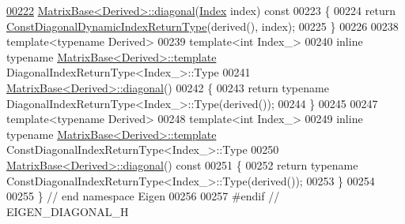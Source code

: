\begin{DoxyCode}
\hyperlink{group___core___module_aed11a711c0a3d5dbf8bc094008e29846}{00222} \hyperlink{group___core___module_ab5768147536273eb2dbdfa389cfd26a3}{MatrixBase<Derived>::diagonal}(\hyperlink{namespace_eigen_a62e77e0933482dafde8fe197d9a2cfde}{Index} index)\textcolor{keyword}{ const}
00223 \textcolor{keyword}{}\{
00224   \textcolor{keywordflow}{return} \hyperlink{group___core___module_class_eigen_1_1_transpose}{ConstDiagonalDynamicIndexReturnType}(derived(), index);
00225 \}
00226 
00238 \textcolor{keyword}{template}<\textcolor{keyword}{typename} Derived>
00239 \textcolor{keyword}{template}<\textcolor{keywordtype}{int} Index\_>
00240 \textcolor{keyword}{inline} \textcolor{keyword}{typename} \hyperlink{group___core___module_class_eigen_1_1_matrix_base}{MatrixBase<Derived>::template} 
      DiagonalIndexReturnType<Index\_>::Type
00241 \hyperlink{group___core___module_ab5768147536273eb2dbdfa389cfd26a3}{MatrixBase<Derived>::diagonal}()
00242 \{
00243   \textcolor{keywordflow}{return} \textcolor{keyword}{typename} DiagonalIndexReturnType<Index\_>::Type(derived());
00244 \}
00245 
00247 \textcolor{keyword}{template}<\textcolor{keyword}{typename} Derived>
00248 \textcolor{keyword}{template}<\textcolor{keywordtype}{int} Index\_>
00249 \textcolor{keyword}{inline} \textcolor{keyword}{typename} \hyperlink{group___core___module_class_eigen_1_1_matrix_base}{MatrixBase<Derived>::template} 
      ConstDiagonalIndexReturnType<Index\_>::Type
00250 \hyperlink{group___core___module_ab5768147536273eb2dbdfa389cfd26a3}{MatrixBase<Derived>::diagonal}()\textcolor{keyword}{ const}
00251 \textcolor{keyword}{}\{
00252   \textcolor{keywordflow}{return} \textcolor{keyword}{typename} ConstDiagonalIndexReturnType<Index\_>::Type(derived());
00253 \}
00254 
00255 \} \textcolor{comment}{// end namespace Eigen}
00256 
00257 \textcolor{preprocessor}{#endif // EIGEN\_DIAGONAL\_H}
\end{DoxyCode}
